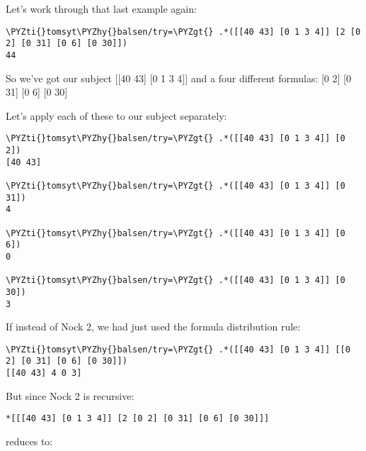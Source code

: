 Let's work through that last example again:

\begin{framed_shaded}
\begin{Verbatim}[fontsize=\relsize{-2.5},fontseries=b,commandchars=\\\{\}]
\PYZti{}tomsyt\PYZhy{}balsen/try=\PYZgt{} .*([[40 43] [0 1 3 4]] [2 [0 2] [0 31] [0 6] [0 30]])
44
\end{Verbatim}
\end{framed_shaded}

So we've got our subject [[40 43] [0 1 3 4]] and a four different formulas: 
[0 2] [0 31] [0 6] [0 30]

Let's apply each of these to our subject separately:

\begin{framed_shaded}
\begin{Verbatim}[fontsize=\relsize{-2.5},fontseries=b,commandchars=\\\{\}]
\PYZti{}tomsyt\PYZhy{}balsen/try=\PYZgt{} .*([[40 43] [0 1 3 4]] [0 2])
[40 43]

\PYZti{}tomsyt\PYZhy{}balsen/try=\PYZgt{} .*([[40 43] [0 1 3 4]] [0 31])
4

\PYZti{}tomsyt\PYZhy{}balsen/try=\PYZgt{} .*([[40 43] [0 1 3 4]] [0 6])
0

\PYZti{}tomsyt\PYZhy{}balsen/try=\PYZgt{} .*([[40 43] [0 1 3 4]] [0 30])
3
\end{Verbatim}
\end{framed_shaded}

If instead of Nock 2, we had just used the formula distribution rule:

\begin{framed_shaded}
\begin{Verbatim}[fontsize=\relsize{-2.5},fontseries=b,commandchars=\\\{\}]
\PYZti{}tomsyt\PYZhy{}balsen/try=\PYZgt{} .*([[40 43] [0 1 3 4]] [[0 2] [0 31] [0 6] [0 30]])
[[40 43] 4 0 3]
\end{Verbatim}
\end{framed_shaded}

But since Nock 2 is recursive:

\begin{framed_shaded}
\begin{Verbatim}[fontsize=\relsize{-2.5},fontseries=b,commandchars=\\\{\}]
*[[[40 43] [0 1 3 4]] [2 [0 2] [0 31] [0 6] [0 30]]]
\end{Verbatim}
\end{framed_shaded}
reduces to:

